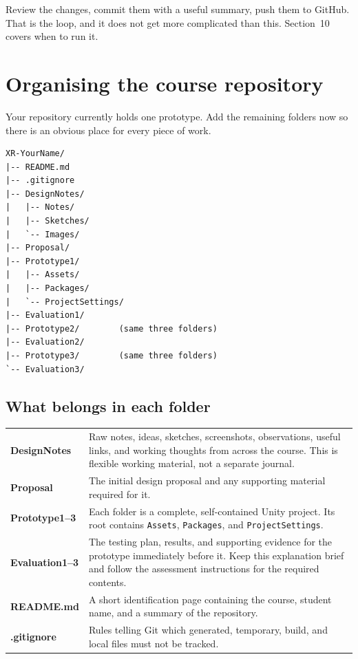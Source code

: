 \documentclass[11pt,a4paper]{article}
\newcommand{\pathbit}[1]{\texttt{#1}}
\begin{document}
\begin{keybox}
Review the changes, commit them with a useful summary, push them to GitHub. That is the
loop, and it does not get more complicated than this. Section~10 covers when to run it.
\end{keybox}

\section{Organising the course repository}

Your repository currently holds one prototype. Add the remaining folders now so there is
an obvious place for every piece of work.

\begin{center}
\begin{minipage}{0.72\textwidth}
\begin{plainbox}
\begin{verbatim}
XR-YourName/
|-- README.md
|-- .gitignore
|-- DesignNotes/
|   |-- Notes/
|   |-- Sketches/
|   `-- Images/
|-- Proposal/
|-- Prototype1/
|   |-- Assets/
|   |-- Packages/
|   `-- ProjectSettings/
|-- Evaluation1/
|-- Prototype2/        (same three folders)
|-- Evaluation2/
|-- Prototype3/        (same three folders)
`-- Evaluation3/
\end{verbatim}
\end{plainbox}
\end{minipage}
\end{center}

\subsection{What belongs in each folder}

\begin{tabularx}{\textwidth}{>{\bfseries}p{32mm}Y}
\toprule
DesignNotes & Raw notes, ideas, sketches, screenshots, observations, useful links, and
working thoughts from across the course. This is flexible working material, not a
separate journal.\\
Proposal & The initial design proposal and any supporting material required for it.\\
Prototype1--3 & Each folder is a complete, self-contained Unity project. Its root
contains \pathbit{Assets}, \pathbit{Packages}, and \pathbit{ProjectSettings}.\\
Evaluation1--3 & The testing plan, results, and supporting evidence for the prototype
immediately before it. Keep this explanation brief and follow the assessment
instructions for the required contents.\\
README.md & A short identification page containing the course, student name, and a
summary of the repository.\\
.gitignore & Rules telling Git which generated, temporary, build, and local files must
not be tracked.\\
\bottomrule
\end{tabularx}
\end{document}
